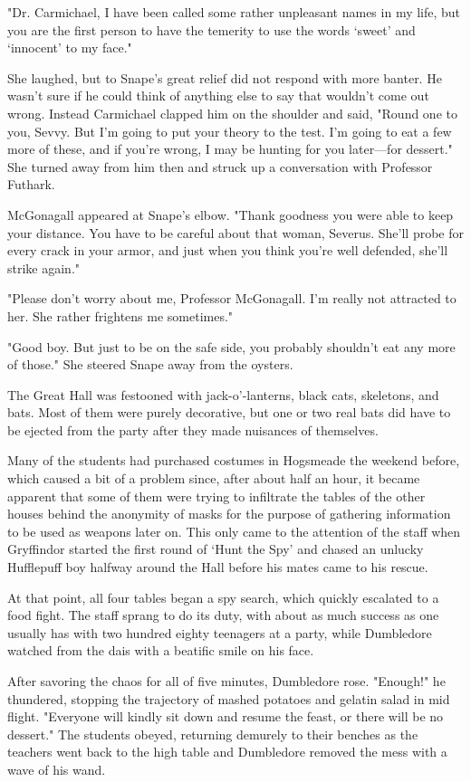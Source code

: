 "Dr. Carmichael, I have been called some rather unpleasant names in my life, but you are the first person to have the temerity to use the words `sweet' and `innocent' to my face."

She laughed, but to Snape's great relief did not respond with more banter. He wasn't sure if he could think of anything else to say that wouldn't come out wrong. Instead Carmichael clapped him on the shoulder and said, "Round one to you, Sevvy. But I'm going to put your theory to the test. I'm going to eat a few more of these, and if you're wrong, I may be hunting for you later—for dessert." She turned away from him then and struck up a conversation with Professor Futhark.

McGonagall appeared at Snape's elbow. "Thank goodness you were able to keep your distance. You have to be careful about that woman, Severus. She'll probe for every crack in your armor, and just when you think you're well defended, she'll strike again."

"Please don't worry about me, Professor McGonagall. I'm really not attracted to her. She rather frightens me sometimes."

"Good boy. But just to be on the safe side, you probably shouldn't eat any more of those." She steered Snape away from the oysters.

The Great Hall was festooned with jack-o'-lanterns, black cats, skeletons, and bats. Most of them were purely decorative, but one or two real bats did have to be ejected from the party after they made nuisances of themselves.

Many of the students had purchased costumes in Hogsmeade the weekend before, which caused a bit of a problem since, after about half an hour, it became apparent that some of them were trying to infiltrate the tables of the other houses behind the anonymity of masks for the purpose of gathering information to be used as weapons later on. This only came to the attention of the staff when Gryffindor started the first round of `Hunt the Spy' and chased an unlucky Hufflepuff boy halfway around the Hall before his mates came to his rescue.

At that point, all four tables began a spy search, which quickly escalated to a food fight. The staff sprang to do its duty, with about as much success as one usually has with two hundred eighty teenagers at a party, while Dumbledore watched from the dais with a beatific smile on his face.

After savoring the chaos for all of five minutes, Dumbledore rose. "Enough!" he thundered, stopping the trajectory of mashed potatoes and gelatin salad in mid flight. "Everyone will kindly sit down and resume the feast, or there will be no dessert." The students obeyed, returning demurely to their benches as the teachers went back to the high table and Dumbledore removed the mess with a wave of his wand.

